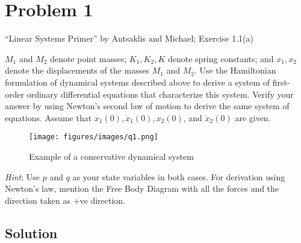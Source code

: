 \section*{Problem 1}

``Linear Systems Primer'' by Antsaklis and Michael;
Exercise 1.1(a)

\(M_1\) and \(M_2\) denote point masses; \(K_1, K_2, K\) denote spring constants; and \(x_1,x_2\) denote the displacements of the masses \(M_1\) and \(M_2\).
Use the Hamiltonian formulation of dynamical systems described above to derive a system of first-order ordinary differential equations that characterize this system.
Verify your answer by using Newton's second law of motion to derive the same system of equations.
Assume that \(x_1(0), \dot x_1(0), x_2(0)\), and \(\dot x_2(0)\) are given.

\begin{figure}[h]
    \centering
    \texttt{[image: figures/images/q1.png]}
    \caption{
        Example of a conservative dynamical system
    }\label{fig:q1}
\end{figure}

\textit{Hint}: Use \(p\) and \(q\) as your state variables in both cases.
For derivation using Newton's law, mention the Free Body Diagram with all the forces and the direction taken as +ve direction.

\subsection*{Solution}

